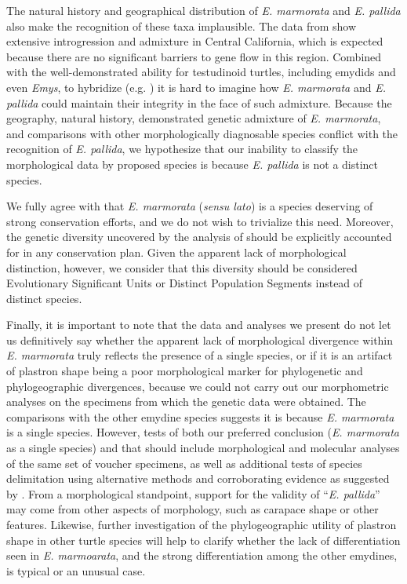 \documentclass[12pt,letterpaper]{article}
\begin{document}
The natural history and geographical distribution of \textit{E. marmorata} and \textit{E. pallida} also make the recognition of these taxa implausible. The data from \citet{Spinks2014} show extensive introgression and admixture in Central California, which is expected because there are no significant barriers to gene flow in this region. Combined with the well-demonstrated ability for testudinoid turtles, including emydids and even \textit{Emys}, to hybridize (e.g. \citealt{Buskirk2005,Spinks2009,Parham2013}) it is hard to imagine how \textit{E. marmorata} and \textit{E. pallida} could maintain their integrity in the face of such admixture. Because the geography, natural history, demonstrated genetic admixture of \textit{E. marmorata}, and comparisons with other morphologically diagnosable species conflict with the recognition of \textit{E. pallida}, we hypothesize that our inability to classify the morphological data by proposed species is because \textit{E. pallida} is not a distinct species. 

We fully agree with \citet{Spinks2014} that \textit{E. marmorata} (\textit{sensu lato}) is a species deserving of strong conservation efforts, and we do not wish to trivialize this need. Moreover, the genetic diversity uncovered by the analysis of \citet{Spinks2014} should be explicitly accounted for in any conservation plan. Given the apparent lack of morphological distinction, however, we consider that this diversity should be considered Evolutionary Significant Units or Distinct Population Segments instead of distinct species.

Finally, it is important to note that the data and analyses we present do not let us definitively say whether the apparent lack of morphological divergence within \textit{E. marmorata} truly reflects the presence of a single species, or if it is an artifact of plastron shape being a poor morphological marker for phylogenetic and phylogeographic divergences, because we could not carry out our morphometric analyses on the specimens from which the genetic data were obtained. The comparisons with the other emydine species suggests it is because \textit{E. marmorata} is a single species. However, tests of both our preferred conclusion (\textit{E. marmorata} as a single species) and that \citet{Spinks2014} should include morphological and molecular analyses of the same set of voucher specimens, as well as additional tests of species delimitation using alternative methods and corroborating evidence as suggested by \citet{Carstens2013}. From a morphological standpoint, support for the validity of ``\textit{E. pallida}'' may come from other aspects of morphology, such as carapace shape or other features. Likewise, further investigation of the phylogeographic utility of plastron shape in other turtle species will help to clarify whether the lack of differentiation seen in \textit{E. marmoarata}, and the strong differentiation among the other emydines, is typical or an unusual case.
\end{document}
